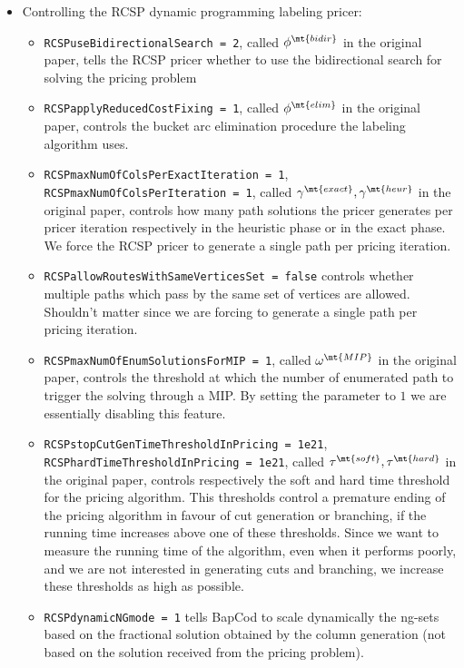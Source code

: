 \begin{itemize}
	\item Controlling the RCSP dynamic programming labeling pricer:
	      \begin{itemize}
		      \item \texttt{RCSPuseBidirectionalSearch = 2}, called $\phi^\mt{bidir}$ in the original paper, tells the RCSP pricer whether to use the bidirectional search for solving the pricing problem
		      \item \texttt{RCSPapplyReducedCostFixing = 1}, called $\phi^\mt{elim}$ in the original paper, controls the bucket arc elimination procedure the labeling algorithm uses.
		      \item \texttt{RCSPmaxNumOfColsPerExactIteration = 1}, \texttt{RCSPmaxNumOfColsPerIteration = 1},
		            called $\gamma^\mt{exact}, \gamma^\mt{heur}$ in the original paper,
		            controls how many path solutions the pricer generates per pricer iteration respectively in the heuristic phase or in the exact phase.
		            We force the RCSP pricer to generate a single path per pricing iteration.
		      \item \texttt{RCSPallowRoutesWithSameVerticesSet = false} controls whether multiple paths which pass by the same set of vertices are allowed.
		            Shouldn't matter since we are forcing to generate a single path per pricing iteration.
		      \item \texttt{RCSPmaxNumOfEnumSolutionsForMIP = 1}, called $\omega^\mt{MIP}$ in the original paper, controls the threshold at which the number of enumerated path to trigger the solving through a MIP.
		            By setting the parameter to $1$ we are essentially disabling this feature.
		      \item \texttt{RCSPstopCutGenTimeThresholdInPricing = 1e21}, \texttt{RCSPhardTimeThresholdInPricing = 1e21}, called $\tau^\mt{soft}, \tau^\mt{hard}$ in the original paper, controls respectively the soft and hard time threshold for the pricing algorithm.
		            This thresholds control a premature ending of the pricing algorithm in favour of cut generation or branching, if the running time increases above one of these thresholds.
		            Since we want to measure the running time of the algorithm, even when it performs poorly, and we are not interested in generating cuts and branching, we increase these thresholds as high as possible.
		      \item \texttt{RCSPdynamicNGmode = 1} tells BapCod to scale dynamically the ng-sets based on the fractional solution obtained by the column generation (not based on the solution received from the pricing problem).

\end{itemize}
\end{itemize}
